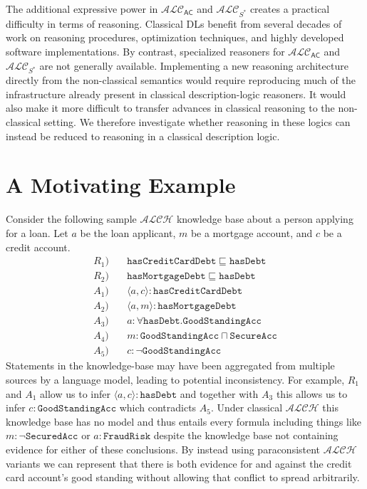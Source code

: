 \documentclass[letterpaper]{article}
\begin{document}
The additional expressive power in $\mathcal{ALC}_\mathsf{AC}$ and $\mathcal{ALC}_{S^\ast}$ creates a practical difficulty in terms of reasoning. Classical DLs benefit from several decades of work on reasoning procedures, optimization techniques, and highly developed software implementations. By contrast, specialized reasoners for $\mathcal{ALC}_\mathsf{AC}$ and $\mathcal{ALC}_{S^\ast}$ are not generally available. Implementing a new reasoning architecture directly from the non-classical semantics would require reproducing much of the infrastructure already present in classical description-logic reasoners. It would also make it more difficult to transfer advances in classical reasoning to the non-classical setting. We therefore investigate whether reasoning in these logics can instead be reduced to reasoning in a classical description logic. 

\section{A Motivating Example}

Consider the following sample $\mathcal{ALCH}$ knowledge base about a person applying for a loan. Let $a$ be the loan applicant, $m$ be a mortgage account, and $c$ be a credit account.
$$\begin{aligned}
R_1 ) \quad& \mathtt{hasCreditCardDebt} \sqsubseteq \mathtt{hasDebt}  \\
R_2) \quad& \mathtt{hasMortgageDebt} \sqsubseteq \mathtt{hasDebt} \\
A_1) \quad&\langle a,c \rangle : \mathtt{hasCreditCardDebt} \\
A_2) \quad&\langle a,m \rangle : \mathtt{hasMortgageDebt} \\
A_3) \quad&a:\forall \mathtt{hasDebt}.\mathtt{GoodStandingAcc} \\
A_4) \quad&m:\mathtt{GoodStandingAcc} \sqcap \mathtt{SecureAcc} \\
A_5) \quad&c : \lnot \mathtt{GoodStandingAcc}
\end{aligned}$$
Statements in the knowledge-base may have been aggregated from multiple sources by a language model, leading to potential inconsistency. For example, $R_1$ and $A_1$ allow us to infer $\langle a,c\rangle : \mathtt{hasDebt} $ and together with $A_3$ this allows us to infer $c : \mathtt{GoodStandingAcc}$ which contradicts $A_5$. Under classical $\mathcal{ALCH}$ this knowledge base has no model and thus entails every formula including things like $m : \lnot \mathtt{SecuredAcc}$ or $a : \mathtt{FraudRisk}$ despite the knowledge base not containing evidence for either of these conclusions. By instead using paraconsistent $\mathcal{ALCH}$ variants we can represent that there is both evidence for and against the credit card account's good standing without allowing that conflict to spread arbitrarily.   
\end{document}
